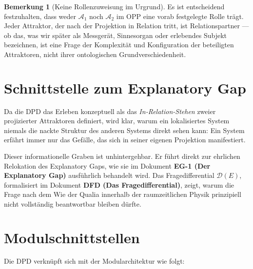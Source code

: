 \documentclass[11pt,a4paper]{article}
\theoremstyle{plain}
\theoremstyle{definition}
\newtheorem{remark}{Bemerkung}[section]
\begin{document}
\begin{remark}[Keine Rollenzuweisung im Urgrund]
Es ist entscheidend festzuhalten, dass weder $\mathcal{A}_1$ noch $\mathcal{A}_2$ im
OPP eine vorab festgelegte Rolle tr\"{a}gt. Jeder Attraktor, der nach der Projektion in
Relation tritt, ist Relationspartner --- ob das, was wir sp\"{a}ter als
\glqq{}Messger\"{a}t\grqq{}, \glqq{}Sinnesorgan\grqq{} oder \glqq{}erlebendes
Subjekt\grqq{} bezeichnen, ist eine Frage der Komplexit\"{a}t und Konfiguration der
beteiligten Attraktoren, nicht ihrer ontologischen Grundverschiedenheit.
\end{remark}

\section{Schnittstelle zum Explanatory Gap}

Da die DPD das Erleben konzeptuell als das \emph{In-Relation-Stehen} zweier projizierter
Attraktoren definiert, wird klar, warum ein lokalisiertes System niemals die nackte
Struktur des anderen Systems direkt \glqq{}sehen\grqq{} kann: Ein System erf\"{a}hrt
immer nur das Gef\"{a}lle, das sich in seiner eigenen Projektion manifestiert.

Dieser informationelle Graben ist unhintergehbar. Er f\"{u}hrt direkt zur ehrlichen
Relokation des Explanatory Gaps, wie sie im Dokument \textbf{EG-1 (Der Explanatory Gap)}
ausf\"{u}hrlich behandelt wird. Das Fragedifferential $\mathcal{D}(E)$, formalisiert im
Dokument \textbf{DFD (Das Fragedifferential)}, zeigt, warum die Frage nach dem
\glqq{}Wie\grqq{} der Qualia innerhalb der raumzeitlichen Physik prinzipiell nicht
vollst\"{a}ndig beantwortbar bleiben d\"{u}rfte.

\section{Modulschnittstellen}

Die DPD verkn\"{u}pft sich mit der Modularchitektur wie folgt:
\end{document}
